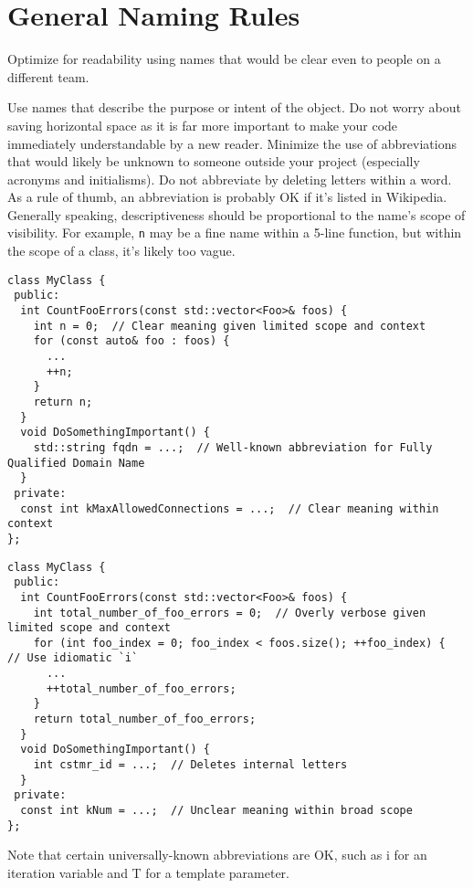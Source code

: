 
\section{General Naming Rules}\label{sec:general-naming-rules}
Optimize for readability using names that would be clear even to people on a different team.

Use names that describe the purpose or intent of the object. Do not worry about saving horizontal space as it is far more important to make your code immediately understandable by a new reader. Minimize the use of abbreviations that would likely be unknown to someone outside your project (especially acronyms and initialisms). Do not abbreviate by deleting letters within a word. As a rule of thumb, an abbreviation is probably OK if it's listed in Wikipedia. Generally speaking, descriptiveness should be proportional to the name's scope of visibility. For example, \texttt{n} may be a fine name within a 5-line function, but within the scope of a class, it's likely too vague.
\begin{verbatim}
class MyClass {
 public:
  int CountFooErrors(const std::vector<Foo>& foos) {
    int n = 0;  // Clear meaning given limited scope and context
    for (const auto& foo : foos) {
      ...
      ++n;
    }
    return n;
  }
  void DoSomethingImportant() {
    std::string fqdn = ...;  // Well-known abbreviation for Fully Qualified Domain Name
  }
 private:
  const int kMaxAllowedConnections = ...;  // Clear meaning within context
};
\end{verbatim}
\begin{verbatim}
class MyClass {
 public:
  int CountFooErrors(const std::vector<Foo>& foos) {
    int total_number_of_foo_errors = 0;  // Overly verbose given limited scope and context
    for (int foo_index = 0; foo_index < foos.size(); ++foo_index) {  // Use idiomatic `i`
      ...
      ++total_number_of_foo_errors;
    }
    return total_number_of_foo_errors;
  }
  void DoSomethingImportant() {
    int cstmr_id = ...;  // Deletes internal letters
  }
 private:
  const int kNum = ...;  // Unclear meaning within broad scope
};
\end{verbatim}
Note that certain universally-known abbreviations are OK, such as i for an iteration variable and T for a template parameter.

